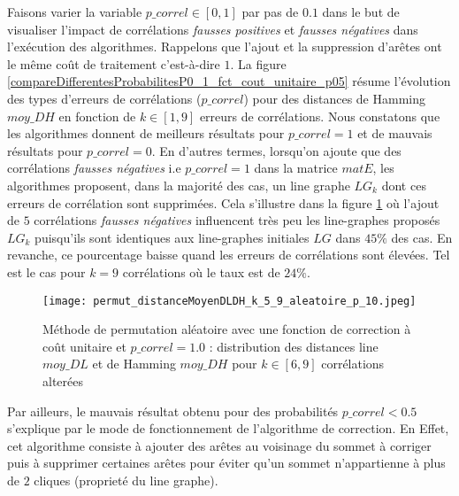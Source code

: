 Faisons varier la variable $p\_correl \in [0,1]$ par pas de $0.1$ dans le but de visualiser l'impact de corr\'elations {\em fausses positives} et {\em fausses n\'egatives} dans l'ex\'ecution des algorithmes. Rappelons que l'ajout et la suppression d'ar\^etes ont le m\^eme co\^ut de traitement c'est-\`a-dire $1$.
La figure \ref{compareDifferentesProbabilitesP0_1_fct_cout_unitaire_p05} r\'esume l'\'evolution des types d'erreurs de corr\'elations ($p\_correl$) pour des distances de Hamming $moy\_DH$ en fonction de  $k \in [1, 9]$  erreurs de corr\'elations.
\newline 
Nous constatons que les algorithmes donnent de meilleurs r\'esultats pour $p\_correl = 1$ et de mauvais r\'esultats pour $p\_correl = 0$. 
En d'autres termes, lorsqu'on ajoute que des corr\'elations {\em fausses n\'egatives} i.e $p\_correl  = 1$ dans la matrice $matE$, les algorithmes  proposent, dans la majorit\'e des cas, un line graphe $LG_k$ dont ces erreurs de corr\'elation sont supprim\'ees. Cela s'illustre dans la figure \ref{permut_distanceMoyenDLDH_k_5_9_aleatoire_p_10} o\`u l'ajout de $5$ corr\'elations {\em fausses n\'egatives} influencent tr\`es peu les line-graphes propos\'es $LG_{k}$ puisqu'ils sont identiques aux line-graphes initiales $LG$ dans $45\%$ des cas. 
En revanche, ce pourcentage baisse quand les erreurs de corr\'elations sont \'elev\'ees. Tel est le cas pour $k = 9$ corr\'elations o\`u le taux est de $24\%$. 
\begin{figure}[htb!] 
\centering
\texttt{[image: permut\_distanceMoyenDLDH\_k\_5\_9\_aleatoire\_p\_10.jpeg]}
\caption{ M\'ethode de permutation al\'eatoire avec une fonction de correction \`a co\^ut unitaire et $p\_correl = 1.0$ : distribution des distances line $moy\_DL$ et de Hamming $moy\_DH$ pour $k \in [6,  9]$ corr\'elations alter\'ees}
\label{permut_distanceMoyenDLDH_k_5_9_aleatoire_p_10} 
\end{figure}
\newline
Par ailleurs, le mauvais r\'esultat obtenu pour des probabilit\'es $p\_correl < 0.5$ s'explique par le mode de fonctionnement de l'algorithme de correction. En Effet, cet algorithme consiste \`a ajouter des ar\^etes au voisinage du sommet \`a corriger puis \`a supprimer certaines ar\^etes pour \'eviter qu'un sommet n'appartienne \`a plus de $2$ cliques (propriet\'e du line graphe).
\newline
